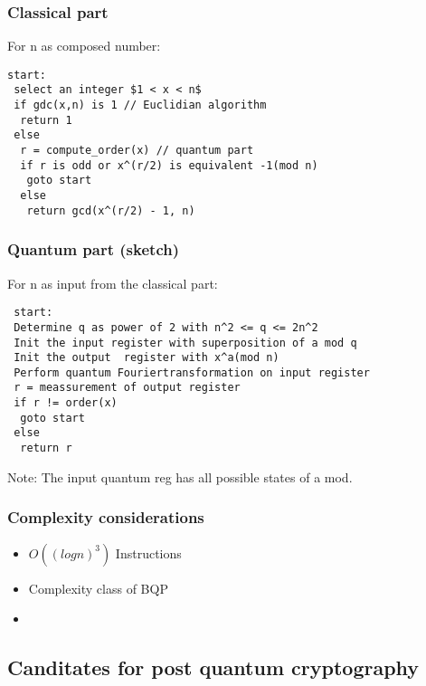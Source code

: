 			\begin{frame}[fragile]
				\frametitle{Classical part}
					For n as composed number: 
										\footnotesize{
						\begin{lstlisting}
start:
 select an integer $1 < x < n$
 if gdc(x,n) is 1 // Euclidian algorithm
  return 1
 else
  r = compute_order(x) // quantum part
  if r is odd or x^(r/2) is equivalent -1(mod n)
   goto start 
  else
   return gcd(x^(r/2) - 1, n)
						\end{lstlisting}
					}
\end{frame}


			\begin{frame}[fragile]
				\frametitle{Quantum part (sketch)}
					For n as input from the classical part: 
					\footnotesize{
					\begin{lstlisting}
 start:
 Determine q as power of 2 with n^2 <= q <= 2n^2
 Init the input register with superposition of a mod q
 Init the output  register with x^a(mod n)
 Perform quantum Fouriertransformation on input register
 r = meassurement of output register
 if r != order(x)
  goto start
 else
  return r
					\end{lstlisting} }
Note: The input quantum reg has all possible states of a mod.
\end{frame}
						
			\begin{frame}
				\frametitle{Complexity considerations}
				\begin{itemize}
					\item $O((log n)^3)$ Instructions
					\item Complexity class of BQP
					\item 
					
				\end{itemize}
			\end{frame}
			
	\subsection{Canditates for post quantum cryptography}
	
